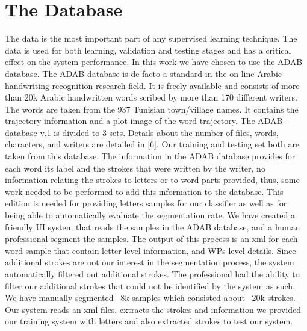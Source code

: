 \documentclass[journal,compsoc]{IEEEtran}
\begin{document}
\section{The Database}
\label{sec:database}
The data is the most important part of any supervised learning technique. The data is used for both learning, validation and testing stages and has a critical effect on the system performance. In this work we have chosen to use the ADAB database. The ADAB database is de-facto a standard in the on line Arabic handwriting recognition research field. It is freely available and consists of more than 20k Arabic handwritten words scribed by more than 170 different writers. The words are taken from the 937 Tunisian town/village names. It contains the trajectory information and a plot image of the word trajectory. The ADAB-database v.1 is divided to 3 sets. Details about the number of files, words, characters, and writers are detailed in [6]. Our training and testing set both are taken from this database. 
The information in the ADAB database provides for each word its label and the strokes that were written by the writer, no information relating the strokes to letters or to word parts provided, thus, some work needed to be performed to add this information to the database. This edition is needed for providing letters samples for our classifier as well as for being able to automatically evaluate the segmentation rate. We have created a friendly UI system that reads the samples in the ADAB database, and a human professional segment the samples. The output of this process is an xml for each word sample that contain letter level information, and WPs level details. Since additional strokes are not our interest in the segmentation process, the system automatically filtered out additional strokes. The professional had the ability to filter our additional strokes that could not be identified by the system as such. We have manually segmented ~8k samples which consisted about ~20k strokes.
Our system reads an xml files, extracts the strokes and information we provided our training system with letters and also extracted strokes to test our system. 
\end{document}
